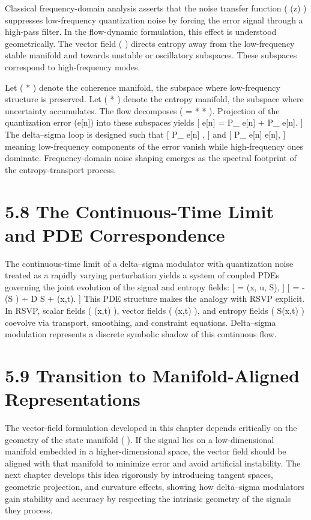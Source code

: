 Classical frequency-domain analysis asserts that the noise transfer function ( (z) ) suppresses low-frequency quantization noise by forcing the error signal through a high-pass filter. In the flow-dynamic formulation, this effect is understood geometrically. The vector field (  ) directs entropy away from the low-frequency stable manifold and towards unstable or oscillatory subspaces. These subspaces correspond to high-frequency modes.

Let ( *{} \subset {} ) denote the coherence manifold, the subspace where low-frequency structure is preserved. Let ( *{} \subset {} ) denote the entropy manifold, the subspace where uncertainty accumulates. The flow decomposes (  = *{} \oplus {}*{} ). Projection of the quantization error (e[n]) into these subspaces yields
[
e[n] = P_{} e[n] + P_{} e[n].
]
The delta–sigma loop is designed such that
[
P_{} e[n] ,
]
and
[
P_{} e[n] \approx e[n],
]
meaning low-frequency components of the error vanish while high-frequency ones dominate. Frequency-domain noise shaping emerges as the spectral footprint of the entropy-transport process.

\section*{5.8 The Continuous-Time Limit and PDE Correspondence}

The continuous-time limit of a delta–sigma modulator with quantization noise treated as a rapidly varying perturbation yields a system of coupled PDEs governing the joint evolution of the signal and entropy fields:
[
 = (x, u, S),
]
[
 = -\nabla \cdot (S ) + D \Delta S + \sigma(x,t).
]
This PDE structure makes the analogy with RSVP explicit. In RSVP, scalar fields ( \Phi(x,t) ), vector fields ( (x,t) ), and entropy fields ( S(x,t) ) coevolve via transport, smoothing, and constraint equations. Delta–sigma modulation represents a discrete symbolic shadow of this continuous flow.

\section*{5.9 Transition to Manifold-Aligned Representations}

The vector-field formulation developed in this chapter depends critically on the geometry of the state manifold (  ). If the signal lies on a low-dimensional manifold embedded in a higher-dimensional space, the vector field should be aligned with that manifold to minimize error and avoid artificial instability. The next chapter develops this idea rigorously by introducing tangent spaces, geometric projection, and curvature effects, showing how delta–sigma modulators gain stability and accuracy by respecting the intrinsic geometry of the signals they process.

